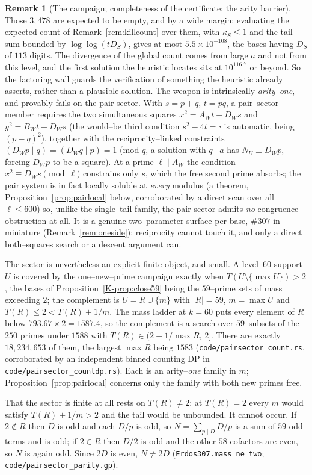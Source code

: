 \documentclass[11pt]{article}
\theoremstyle{definition}
\newtheorem{remark}[theorem]{Remark}
\begin{document}
\begin{remark}[The campaign; completeness of the certificate; the arity barrier]
Those $3{,}478$ are expected to be empty, and by a wide margin: evaluating the expected count of
Remark~\ref{rem:killcount} over them, with $\kappa_S\le1$ and the tail sum bounded by
$\log\log(tD_S)$, gives at most $5.5\times10^{-108}$, the bases having $D_S$ of $113$ digits. The
divergence of the global count comes from large $a$ and not from this level, and the first solution
the heuristic locates sits at $10^{116.7}$ or beyond. So the factoring wall guards the verification of
something the heuristic already asserts, rather than a plausible solution. The weapon is intrinsically \emph{arity--one}, and provably fails on the pair sector. With
$s=p+q$, $t=pq$, a pair--sector member requires the two simultaneous squares $x^2=A_Wt+D_Ws$ and
$y^2=B_Wt+D_Ws$ (the would--be third condition $s^2-4t=\square$ is automatic, being $(p-q)^2$),
together with the reciprocity--linked constraints $(D_Wp\mid q)=(D_Wq\mid p)=1$ (mod $q$, a
solution with $q\mid a$ has $N_U\equiv D_Wp$, forcing $D_Wp$ to be a square). At a prime
$\ell\mid A_W$ the condition $x^2\equiv D_Ws\pmod\ell$ constrains only $s$, which the free second
prime absorbs; the pair system is in fact locally soluble at \emph{every} modulus (a theorem,
Proposition~\ref{prop:pairlocal} below, corroborated by a direct scan over all $\ell\le600$) so,
unlike the single--tail family, the pair sector admits \emph{no} congruence obstruction at all. It
is a genuine two--parameter surface per base, $\#307$ in miniature (Remark~\ref{rem:oneside});
reciprocity cannot touch it, and only a direct both--squares search or a descent argument can.

The sector is nevertheless an explicit finite object, and small. A level--$60$ support $U$ is covered
by the one--new--prime campaign exactly when $T(U\setminus\{\max U\})>2$, the bases of
Proposition~\ref{K-prop:close59} being the $59$--prime sets of mass exceeding $2$; the complement is
$U=R\cup\{m\}$ with $|R|=59$, $m=\max U$ and $T(R)\le2<T(R)+1/m$. The mass ladder at $k=60$ puts
every element of $R$ below $793.67\times2=1587.4$, so the complement is a search over $59$--subsets
of the $250$ primes under $1588$ with $T(R)\in(2-1/\max R,\,2]$. There are exactly
$18{,}234{,}653$ of them, the largest $\max R$ being $1583$ \textup{(\texttt{code/pairsector\_count.rs},
corroborated by an independent binned counting DP in \texttt{code/pairsector\_countdp.rs})}. Each is
an arity--\emph{one} family in $m$; Proposition~\ref{prop:pairlocal} concerns only the family with both new primes free.

That the sector is finite at all rests on $T(R)\ne2$: at $T(R)=2$ every $m$ would satisfy
$T(R)+1/m>2$ and the tail would be unbounded. It cannot occur. If $2\notin R$ then $D$ is odd and each
$D/p$ is odd, so $N=\sum_{p\mid D}D/p$ is a sum of $59$ odd terms and is odd; if $2\in R$ then $D/2$
is odd and the other $58$ cofactors are even, so $N$ is again odd. Since $2D$ is even, $N\ne2D$
\textup{(\texttt{Erdos307.mass\_ne\_two}; \texttt{code/pairsector\_parity.gp})}.


\end{remark}
\end{document}
